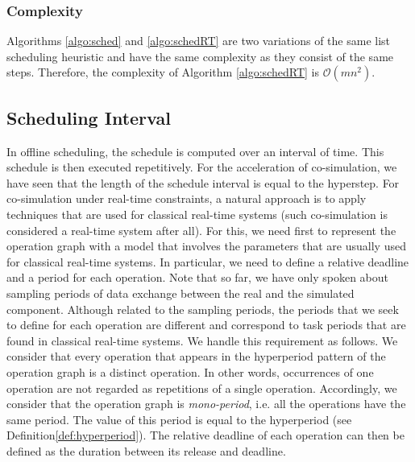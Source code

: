 \subsubsection{Complexity}

Algorithms \ref{algo:sched} and \ref{algo:schedRT} are two variations of the same list scheduling heuristic and have the same complexity as they consist of the same steps. Therefore, the complexity of Algorithm \ref{algo:schedRT} is $\mathcal{O}(mn^2)$.

\subsection{Scheduling Interval}

In offline scheduling, the schedule is computed over an interval of time. This schedule is then executed repetitively. For the acceleration of co-simulation, we have seen that the length of the schedule interval is equal to the hyperstep. For co-simulation under real-time constraints, a natural approach is to apply techniques that are used for classical real-time systems (such co-simulation is considered a real-time system after all). For this, we need first to represent the operation graph with a model that involves the parameters that are usually used for classical real-time systems. In particular, we need to define a relative deadline and a period for each operation. Note that so far, we have only spoken about sampling periods of data exchange between the real and the simulated component. Although related to the sampling periods, the periods that we seek to define for each operation are different and correspond to task periods that are found in classical real-time systems. We handle this requirement as follows. We consider that every operation that appears in the hyperperiod pattern of the operation graph is a distinct operation. In other words, occurrences of one operation are not regarded as repetitions of a single operation. Accordingly, we consider that the operation graph is \textit{mono-period}, i.e. all the operations have the same period. The value of this period is equal to the hyperperiod (see Definition\ref{def:hyperperiod}). The relative deadline of each operation can then be defined as the duration between its release and deadline.   

